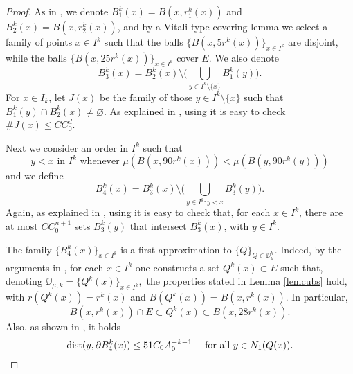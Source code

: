 \begin{proof}
	As in \cite[Theorem 3.2]{David-Mattila}, we denote $B_1^k(x) = B(x,r_1^k(x))$ and $B_2^k(x) = B(x,r_2^k(x))$, and by a Vitali type covering lemma we select a family of points $x\in I^k$
	such that the balls $\{B(x,5r^k(x))\}_{x\in I^k}$ are disjoint, while the balls $\{B(x,25r^k(x))\}_{x\in I^k}$ cover $E$. We also denote
	$$B_3^k(x) =B_2^k(x)\setminus \bigg(\bigcup_{y\in I^k\setminus\{x\}} B_1^k(y)\bigg).$$
	For $x\in I_k$, let $J(x)$ be the family of those
	$y\in I^k\setminus\{x\}$ such that $B_1^k(y)\cap B_2^k(x)\neq
	\varnothing$. As explained in \cite[Theorem 3.2]{David-Mattila}, using  it is easy to check
	$\# J(x) \leq C C_0^d$.
	
	Next we consider an order in $I^k$ such that
	$$\mbox{$y<x$ in $I^k$ whenever $\mu(B(x,90r^k(x)))<\mu(B(y,90r^k(y)))$}$$
	and we define
	$$B_4^k(x) = B_3^k(x) \setminus \bigg(\bigcup_{y\in I^k:y<x} B_3^k(y)\bigg).$$
	Again, as explained in \cite[Theorem 3.2]{David-Mattila}, using  it is easy to check
	that, for each $x\in I^k$, there are at most $C C_0^{n+1}$ sets $B_3^k(y)$ that intersect $B_3^k(x)$, with 
	$y\in I^k$.
	
	The family $\{B_4^k(x)\}_{x\in I^k}$ is a first approximation to $\{Q\}_{Q\in\DD_\mu^k}$.
	Indeed, by the arguments in \cite[Theorem 3.2]{David-Mattila}, for each $x\in I^k$ one constructs 
	a set $Q^k(x)\subset E$
	such that, denoting
	$\DD_{\mu,k} = \{Q^k(x)\}_{x\in I^k},$
	the properties stated in Lemma \ref{lemcubs} hold, with $r(Q^k(x))=r^k(x)$ and $B(Q^k(x))=B(x,r^k(x))$.
	In particular, 
	$$B(x,r^k(x))\cap E\subset Q^k(x) \subset B(x,28r^k(x)).$$
	Also, as shown in \cite[(3.61)]{David-Mattila}, it holds 
	\begin{equation}\label{eqdisb4}
		{\rm dist}(y,\partial B_4^k(x)) \leq 51C_0A_0^{-k-1}\quad \mbox{ for all $y\in N_1(Q(x))$.}
	\end{equation}
	

\end{proof}
